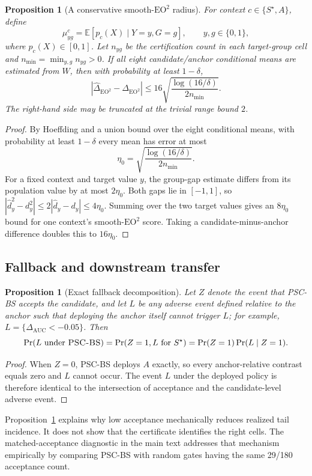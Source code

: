 \documentclass[10pt]{article}
\newcommand{\PSC}{\textsc{PSC-BS}}
\newcommand{\eo}{\mathrm{EO}^2}
\newcommand{\AUC}{\mathrm{AUC}}
\newtheorem{proposition}[theorem]{Proposition}
\begin{document}
\begin{proposition}[A conservative smooth-$\eo$ radius]
\label{prop:eo}
For context $c\in\{S^\star,A\}$, define
\[
\mu^c_{yg}=\mathbb E[p_c(X)\mid Y=y,G=g],
\qquad y,g\in\{0,1\},
\]
where $p_c(X)\in[0,1]$. Let $n_{yg}$ be the certification count in each target-group cell and $n_{\min}=\min_{y,g}n_{yg}>0$. If all eight candidate/anchor conditional means are estimated from $W$, then with probability at least $1-\delta$,
\[
|\widehat\Delta_{\eo}-\Delta_{\eo}|
\le
16\sqrt{\frac{\log(16/\delta)}{2n_{\min}}}.
\]
The right-hand side may be truncated at the trivial range bound $2$.
\end{proposition}

\begin{proof}
By Hoeffding and a union bound over the eight conditional means, with probability at least $1-\delta$ every mean has error at most
\[
\eta_0=\sqrt{\frac{\log(16/\delta)}{2n_{\min}}}.
\]
For a fixed context and target value $y$, the group-gap estimate differs from its population value by at most $2\eta_0$. Both gaps lie in $[-1,1]$, so $|\hat d_y^2-d_y^2|\le 2|\hat d_y-d_y|\le4\eta_0$. Summing over the two target values gives an $8\eta_0$ bound for one context's smooth-$\eo$ score. Taking a candidate-minus-anchor difference doubles this to $16\eta_0$.
\end{proof}

\subsection{Fallback and downstream transfer}

\begin{proposition}[Exact fallback decomposition]
\label{prop:fallback}
Let $Z$ denote the event that \PSC{} accepts the candidate, and let $L$ be any adverse event defined relative to the anchor such that deploying the anchor itself cannot trigger $L$; for example, $L=\{\Delta_{\AUC}<-0.05\}$. Then
\[
\Pr(L\text{ under \PSC{}})
=
\Pr(Z=1,L\text{ for }S^\star)
=
\Pr(Z=1)\Pr(L\mid Z=1).
\]
\end{proposition}

\begin{proof}
When $Z=0$, \PSC{} deploys $A$ exactly, so every anchor-relative contrast equals zero and $L$ cannot occur. The event $L$ under the deployed policy is therefore identical to the intersection of acceptance and the candidate-level adverse event.
\end{proof}

Proposition~\ref{prop:fallback} explains why low acceptance mechanically reduces realized tail incidence. It does not show that the certificate identifies the right cells. The matched-acceptance diagnostic in the main text addresses that mechanism empirically by comparing \PSC{} with random gates having the same 29/180 acceptance count.
\end{document}
